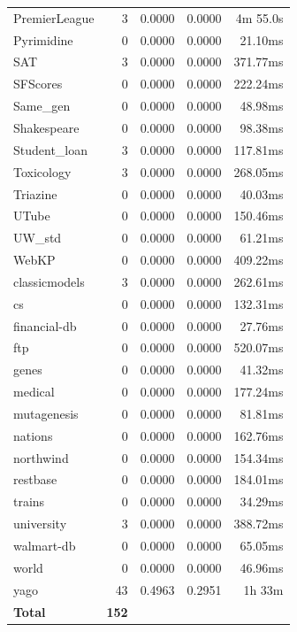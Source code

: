 \documentclass[11pt,a4paper]{article}
\begin{document}
\begin{table}[h!]
\begin{tabular}{|l|r|r|r|r|}
PremierLeague & 3 & 0.0000 & 0.0000 & 4m 55.0s \\
Pyrimidine & 0 & 0.0000 & 0.0000 & 21.10ms \\
SAT & 3 & 0.0000 & 0.0000 & 371.77ms \\
SFScores & 0 & 0.0000 & 0.0000 & 222.24ms \\
Same_gen & 0 & 0.0000 & 0.0000 & 48.98ms \\
Shakespeare & 0 & 0.0000 & 0.0000 & 98.38ms \\
Student_loan & 3 & 0.0000 & 0.0000 & 117.81ms \\
Toxicology & 3 & 0.0000 & 0.0000 & 268.05ms \\
Triazine & 0 & 0.0000 & 0.0000 & 40.03ms \\
UTube & 0 & 0.0000 & 0.0000 & 150.46ms \\
UW_std & 0 & 0.0000 & 0.0000 & 61.21ms \\
WebKP & 0 & 0.0000 & 0.0000 & 409.22ms \\
classicmodels & 3 & 0.0000 & 0.0000 & 262.61ms \\
cs & 0 & 0.0000 & 0.0000 & 132.31ms \\
financial-db & 0 & 0.0000 & 0.0000 & 27.76ms \\
ftp & 0 & 0.0000 & 0.0000 & 520.07ms \\
genes & 0 & 0.0000 & 0.0000 & 41.32ms \\
medical & 0 & 0.0000 & 0.0000 & 177.24ms \\
mutagenesis & 0 & 0.0000 & 0.0000 & 81.81ms \\
nations & 0 & 0.0000 & 0.0000 & 162.76ms \\
northwind & 0 & 0.0000 & 0.0000 & 154.34ms \\
restbase & 0 & 0.0000 & 0.0000 & 184.01ms \\
trains & 0 & 0.0000 & 0.0000 & 34.29ms \\
university & 3 & 0.0000 & 0.0000 & 388.72ms \\
walmart-db & 0 & 0.0000 & 0.0000 & 65.05ms \\
world & 0 & 0.0000 & 0.0000 & 46.96ms \\
yago & 43 & 0.4963 & 0.2951 & 1h 33m \\
\hline
\textbf{Total} & \textbf{152} & & & \\
\hline
\end{tabular}
\end{table}
\end{document}
